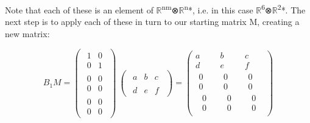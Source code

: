 \documentclass[oneside,english]{amsbook}
\numberwithin{section}{chapter}
\theoremstyle{plain}
\theoremstyle{definition}
\begin{document}
Note that each of these is an element of
$\mathbb{R}$\textsuperscript{nm}⊗$\mathbb{R}$\textsuperscript{n}*, i.e. in
this case $\mathbb{R}$\textsuperscript{6}⊗$\mathbb{R}$\textsuperscript{2}*.
The next step is to apply each of these in turn to our starting matrix
M, creating a new matrix:

\[B_{1}M = \begin{pmatrix}
	\begin{matrix}
		1 & 0 \\
		0 & 1
	\end{matrix} \\
	\begin{matrix}
		0 & 0 \\
		0 & 0
	\end{matrix} \\
	\begin{matrix}
		0 & 0 \\
		0 & 0
	\end{matrix}
\end{pmatrix}\ \begin{pmatrix}
	\begin{matrix}
		a & b & c
	\end{matrix} \\
	\begin{matrix}
		d & e & f
	\end{matrix}
\end{pmatrix} = \begin{pmatrix}
	a & b & c \\
	d & e & f \\
	\begin{matrix}
		0 \\
		0 \\
		\begin{matrix}
			0 \\
			0
		\end{matrix}
	\end{matrix} & \begin{matrix}
		0 \\
		0 \\
		\begin{matrix}
			0 \\
			0
		\end{matrix}
	\end{matrix} & \begin{matrix}
		0 \\
		0 \\
		\begin{matrix}
			0 \\
			0
		\end{matrix}
	\end{matrix}
\end{pmatrix}\]
\end{document}
